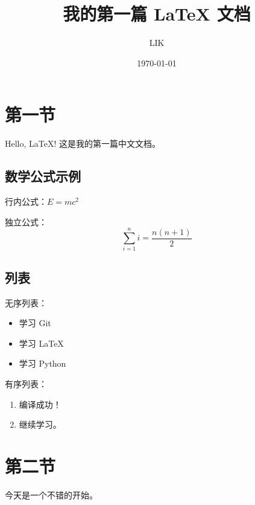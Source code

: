 \documentclass[12pt,a4paper]{ctexart}
\title{我的第一篇 \LaTeX{} 文档}
\author{LIK}
\date{\today}
\begin{document}
\maketitle

\section{第一节}

Hello, \LaTeX! 这是我的第一篇中文文档。

\subsection{数学公式示例}

行内公式：$E = mc^2$

独立公式：
\begin{equation}
    \sum_{i=1}^{n} i = \frac{n(n+1)}{2}
\end{equation}

\subsection{列表}

无序列表：
\begin{itemize}
    \item 学习 Git
    \item 学习 \LaTeX
    \item 学习 Python
\end{itemize}

有序列表：
\begin{enumerate}
    \item 编译成功！
    \item 继续学习。
\end{enumerate}

\section{第二节}

今天是一个不错的开始。
\end{document}
